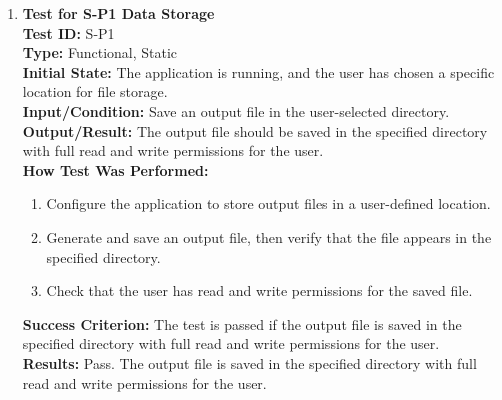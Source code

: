 \documentclass[12pt, titlepage]{article}
\begin{document}
\begin{enumerate}
    \item \textbf{Test for S-P1 Data Storage} \\
      \newline
      \textbf{Test ID:} S-P1 \\
      \textbf{Type:} Functional, Static \\
      \textbf{Initial State:} The application is running, and the user has chosen a specific location for file storage. \\
      \textbf{Input/Condition:} Save an output file in the user-selected directory. \\
      \textbf{Output/Result:} The output file should be saved in the specified directory with full read and write permissions 
      for the user. \\
      \textbf{How Test Was Performed:}
      \begin{enumerate}
          \item Configure the application to store output files in a user-defined location.
          \item Generate and save an output file, then verify that the file appears in the specified directory.
          \item Check that the user has read and write permissions for the saved file.
      \end{enumerate}
      \textbf{Success Criterion:} The test is passed if the output file is saved in the specified directory with full read and write permissions for the user.\\
      \textbf{Results:} Pass. The output file is saved in the specified directory with full read and write permissions for the user.\\


\end{enumerate}
\end{document}

